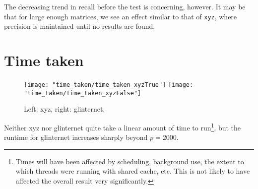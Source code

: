 \documentclass{article}
\begin{document}
The decreasing trend in recall before the test is concerning, however. It may be that for large enough matrices, we see an effect similar to that of \verb|xyz|, where precision is maintained until no results are found.

\section{Time taken}
\begin{figure}[H]
	\begin{minipage}{\linewidth}
		\centering
		\texttt{[image: "time\_taken/time\_taken\_xyzTrue"]}%
		\texttt{[image: "time\_taken/time\_taken\_xyzFalse"]}
	\end{minipage}
	\caption{Left: xyz, right: glinternet.}
\end{figure}
Neither xyz nor glinternet quite take a linear amount of time to run\footnote{Times will have been affected by scheduling, background use, the extent to which threads were running with shared cache, etc. This is not likely to have affected the overall result very significantly.}, but the runtime for glinternet increases sharply beyond $p=2000$.
\end{document}
